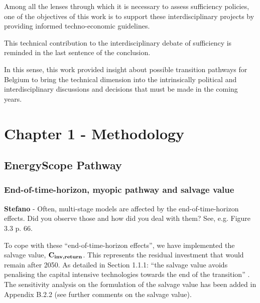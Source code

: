 \documentclass[12pt,a4paper]{article}
\begin{document}
\begin{mdframed}[style=manuscript] %
Among all the lenses through which it is necessary to assess sufficiency policies, one of the objectives of this work is to support these interdisciplinary projects by providing informed techno-economic guidelines.
\end{mdframed}

\noindent This technical contribution to the interdisciplinary debate of sufficiency is reminded in {\color{blue} the last sentence of the conclusion}.

\begin{mdframed}[style=manuscript] %
In this sense, this work provided insight about possible transition pathways for Belgium to bring the technical dimension into the intrinsically political and interdisciplinary discussions and decisions that must be made in the coming years.
\end{mdframed}

\section{Chapter 1 - Methodology}
\label{methodo}

\subsection{EnergyScope Pathway}
\label{ESPathway}

\subsubsection{End-of-time-horizon, myopic pathway and salvage value}

\begin{mdframed}[style=comment] %
{\color{orange} \textbf{Stefano}} - Often, multi-stage models are affected by the end-of-time-horizon effects. Did you observe those and how did you deal with them? See, e.g. Figure 3.3 p. 66.
\end{mdframed}

 \noindent To cope with these ``end-of-time-horizon effects'', we have implemented the salvage value, $\textbf{C\textsubscript{inv,return}}$. This represents the residual investment that would remain after 2050. As detailed in Section 1.1.1: ``the salvage value avoids penalising the capital intensive technologies towards the end of the transition'' \cite{poncelet2016myopic}. The sensitivity analysis on the formulation of the salvage value has been added in Appendix B.2.2 (see further comments on the salvage value).
\end{document}
